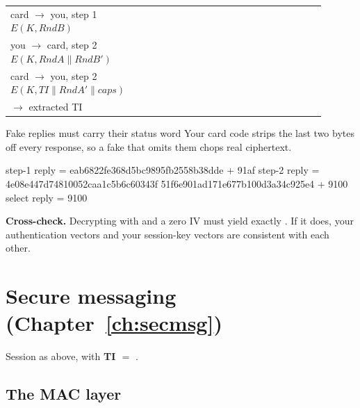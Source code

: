 \begin{center}\small
\begin{tabular}{@{}L{0.36\linewidth}L{0.54\linewidth}@{}}
\toprule
{} &  \\
\midrule
card $\rightarrow$ you, step 1 \newline $E(K, RndB)$ &
   \\
you $\rightarrow$ card, step 2 \newline $E(K, RndA \| RndB')$ &
  \newline
   \\
card $\rightarrow$ you, step 2 \newline $E(K, TI \| RndA' \| caps)$ &
  \newline
   \\
$\rightarrow$ extracted TI &  \\
\bottomrule
\end{tabular}
\end{center}

\begin{trap}{Fake replies must carry their status word}
Your card code strips the last two bytes off every response, so a fake that
omits them chops real ciphertext.

\begin{trace}
step-1 reply = eab6822fe368d5bc9895fb2558b38dde + 91af
step-2 reply = 4e08e447d74810052caa1c5b6c60343f
               51f6e901ad171e677b100d3a34c925e4 + 9100
select reply = 9100
\end{trace}
\end{trap}

\textbf{Cross-check.} Decrypting  with  and a zero
IV must yield exactly . If it does, your
authentication vectors and your session-key vectors are consistent with each
other.

\section{Secure messaging (Chapter~\ref{ch:secmsg})}

Session as above, with \textbf{TI $=$ }.

\subsection{The MAC layer}

